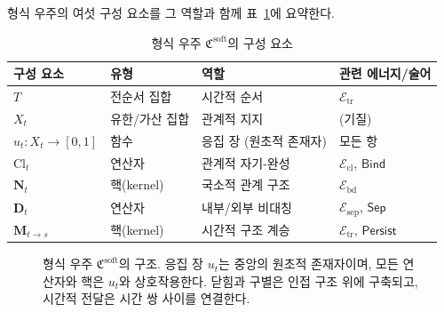 형식 우주의 여섯 구성 요소를 그 역할과 함께 표~\ref{tab:formal-components}에 요약한다.

\begin{table}[ht]
\centering
\caption{형식 우주 $\mathfrak{C}^{\mathrm{soft}}$의 구성 요소}
\label{tab:formal-components}
\begin{tabular}{llll}
\hline
\textbf{구성 요소} & \textbf{유형} & \textbf{역할} & \textbf{관련 에너지/술어} \\
\hline
$T$ & 전순서 집합 & 시간적 순서 & $\mathcal{E}_{\mathrm{tr}}$ \\
$X_t$ & 유한/가산 집합 & 관계적 지지 & (기질) \\
$u_t : X_t \to [0,1]$ & 함수 & 응집 장 (원초적 존재자) & 모든 항 \\
$\mathrm{Cl}_t$ & 연산자 & 관계적 자기-완성 & $\mathcal{E}_{\mathrm{cl}}$, $\mathsf{Bind}$ \\
$\mathbf{N}_t$ & 핵(kernel) & 국소적 관계 구조 & $\mathcal{E}_{\mathrm{bd}}$ \\
$\mathbf{D}_t$ & 연산자 & 내부/외부 비대칭 & $\mathcal{E}_{\mathrm{sep}}$, $\mathsf{Sep}$ \\
$\mathbf{M}_{t \to s}$ & 핵(kernel) & 시간적 구조 계승 & $\mathcal{E}_{\mathrm{tr}}$, $\mathsf{Persist}$ \\
\hline
\end{tabular}
\end{table}

\begin{figure}[t]
\centering
{}
\caption{형식 우주 $\mathfrak{C}^{\mathrm{soft}}$의 구조. 응집 장 $u_t$는 중앙의 원초적 존재자이며, 모든 연산자와 핵은 $u_t$와 상호작용한다. 닫힘과 구별은 인접 구조 위에 구축되고, 시간적 전달은 시간 쌍 사이를 연결한다.}
\label{fig:formal-universe-diagram}
\end{figure}


